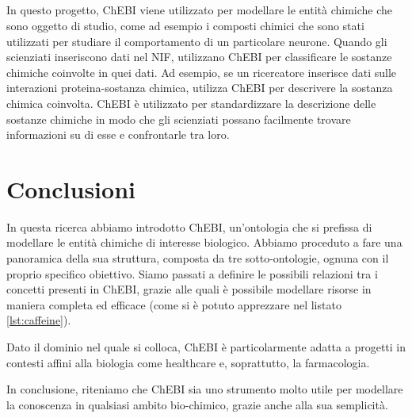 \documentclass[12pt,a4paper,openright,twoside]{book}
\begin{document}
\paragraph{} In questo progetto, ChEBI viene utilizzato per modellare le entità chimiche che sono oggetto di studio, come ad esempio i composti chimici che sono stati utilizzati per studiare il comportamento di un particolare neurone.
Quando gli scienziati inseriscono dati nel NIF, utilizzano ChEBI per classificare le sostanze chimiche coinvolte in quei dati.
Ad esempio, se un ricercatore inserisce dati sulle interazioni proteina-sostanza chimica, utilizza ChEBI per descrivere la sostanza chimica coinvolta.
ChEBI è utilizzato per standardizzare la descrizione delle sostanze chimiche in modo che gli scienziati possano facilmente trovare informazioni su di esse e confrontarle tra loro.

\chapter{Conclusioni}
\label{chap:conclusions}
In questa ricerca abbiamo introdotto ChEBI, un'ontologia che si prefissa di modellare le entità chimiche di interesse biologico. Abbiamo proceduto a fare una panoramica della sua struttura, composta da tre sotto-ontologie, ognuna con il proprio specifico obiettivo. Siamo passati a definire le possibili relazioni tra i concetti presenti in ChEBI, grazie alle quali è possibile modellare risorse in maniera completa ed efficace (come si è potuto apprezzare nel listato \ref{lst:caffeine}).

Dato il dominio nel quale si colloca, ChEBI è particolarmente adatta a progetti in contesti affini alla biologia come healthcare e, soprattutto, la farmacologia.

In conclusione, riteniamo che ChEBI sia uno strumento molto utile per modellare la conoscenza in qualsiasi ambito bio-chimico, grazie anche alla sua semplicità.




\end{document}
